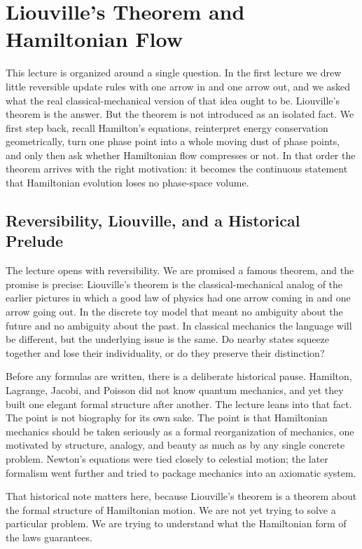 \chapter{Liouville's Theorem and Hamiltonian Flow}

This lecture is organized around a single question. In the first lecture we drew little reversible update rules with one arrow in and one arrow out, and we asked what the real classical-mechanical version of that idea ought to be. Liouville's theorem is the answer. But the theorem is not introduced as an isolated fact. We first step back, recall Hamilton's equations, reinterpret energy conservation geometrically, turn one phase point into a whole moving dust of phase points, and only then ask whether Hamiltonian flow compresses or not. In that order the theorem arrives with the right motivation: it becomes the continuous statement that Hamiltonian evolution loses no phase-space volume.

\section{Reversibility, Liouville, and a Historical Prelude}

The lecture opens with reversibility. We are promised a famous theorem, and the promise is precise: Liouville's theorem is the classical-mechanical analog of the earlier pictures in which a good law of physics had one arrow coming in and one arrow going out. In the discrete toy model that meant no ambiguity about the future and no ambiguity about the past. In classical mechanics the language will be different, but the underlying issue is the same. Do nearby states squeeze together and lose their individuality, or do they preserve their distinction?

Before any formulas are written, there is a deliberate historical pause. Hamilton, Lagrange, Jacobi, and Poisson did not know quantum mechanics, and yet they built one elegant formal structure after another. The lecture leans into that fact. The point is not biography for its own sake. The point is that Hamiltonian mechanics should be taken seriously as a formal reorganization of mechanics, one motivated by structure, analogy, and beauty as much as by any single concrete problem. Newton's equations were tied closely to celestial motion; the later formalism went further and tried to package mechanics into an axiomatic system.

That historical note matters here, because Liouville's theorem is a theorem about the formal structure of Hamiltonian motion. We are not yet trying to solve a particular problem. We are trying to understand what the Hamiltonian form of the laws guarantees.

